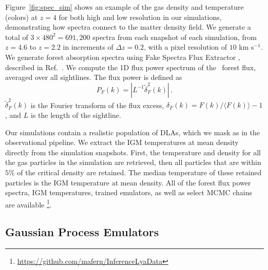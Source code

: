 Figure~\ref{fig:spec_sim} shows an example of the gas density and temperature (colors) at $z=4$ for both high and low resolution in our simulations, demonstrating how spectra connect to the matter density field.
We generate a total of $3\times 480^2 = 691,200$ spectra from each snapshot of each simulation, from $z=4.6$ to $z=2.2$ in increments of $\Delta z=0.2$, with a pixel resolution of $10$ km s$^{-1}$.
We generate \lya forest absorption spectra using Fake Spectra Flux Extractor \cite{2017ascl.soft10012B}\footnotemark, described in Ref.~\cite{2015MNRAS.447.1834B}.
We compute the 1D flux power spectrum of the \Lya~forest flux, averaged over all sightlines.
The flux power is defined as 
\begin{equation}
 P_F(k) = |L^{-1}\tilde{\delta}^2_F(k)|\,.   
\end{equation}
$\tilde{\delta}^2_F(k)$ is the Fourier transform of the flux excess, $\delta_F(k) = F(k)/\langle F(k) \rangle - 1$, and $L$ is the length of the sightline. 

Our simulations contain a realistic population of DLAs, which we mask as in the observational pipeline.
We extract the IGM temperatures at mean density directly from the simulation snapshots.
First, the temperature and density for all the gas particles in the simulation are retrieved, then all particles that are within $5\%$ of the critical density are retained.
The median temperature of these retained particles is the IGM temperature at mean density.
All of the \lya forest flux power spectra, IGM temperatures, trained emulators, as well as select MCMC chains are available \footnote{\url{https://github.com/mafern/InferenceLyaData}}.


\subsection{Gaussian Process Emulators}\label{sec:gps}

